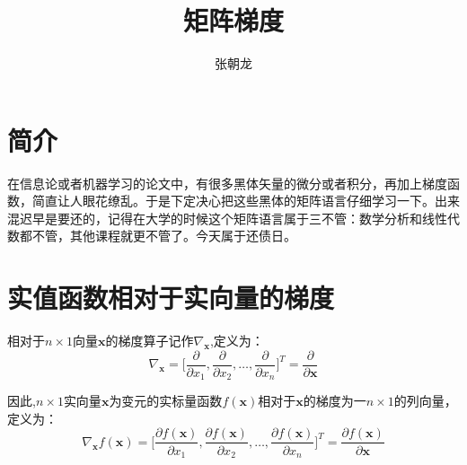 \documentclass[10pt,a4paper,UTF8]{article}
\author{张朝龙}
\date{}
\title{矩阵梯度}
\begin{document}
\maketitle
\tableofcontents
{}

\section{简介}
\label{sec:org58bab04}


在信息论或者机器学习的论文中，有很多黑体矢量的微分或者积分，再加上梯度函数，简直让人眼花缭乱。于是下定决心把这些黑体的矩阵语言仔细学习一下。出来混迟早是要还的，记得在大学的时候这个矩阵语言属于三不管：数学分析和线性代数都不管，其他课程就更不管了。今天属于还债日。

\section{实值函数相对于实向量的梯度}
\label{sec:orgb6e2cb8}


相对于\(n\times 1\)向量\(\mathbf{x}\)的梯度算子记作\(\nabla_{\mathbf{x}}\),定义为：
\begin{equation}
\label{eq:1}
\nabla_{\mathbf{x}} = \bigg[\frac{\partial}{\partial x_{1}}, \frac{\partial}{\partial x_{2}}, \ldots ,\frac{\partial}{\partial x_{n}} \bigg]^{T} = \frac{\partial}{\partial \mathbf{x}}
\end{equation}

因此,\(n\times 1\)实向量\(\mathbf{x}\)为变元的实标量函数\(f(\mathbf{x})\)相对于\(\mathbf{x}\)的梯度为一\(n\times 1\)的列向量，定义为：
\begin{equation}
\label{eq:2}
\nabla_{\mathbf{x}} f(\mathbf{x}) = \bigg[\frac{\partial f(\mathbf{x})}{\partial x_{1}}, \frac{\partial  f(\mathbf{x})}{\partial x_{2}}, \ldots ,\frac{\partial  f(\mathbf{x})}{\partial x_{n}} \bigg]^{T} = \frac{\partial  f(\mathbf{x})}{\partial \mathbf{x}}
\end{equation}
\end{document}
